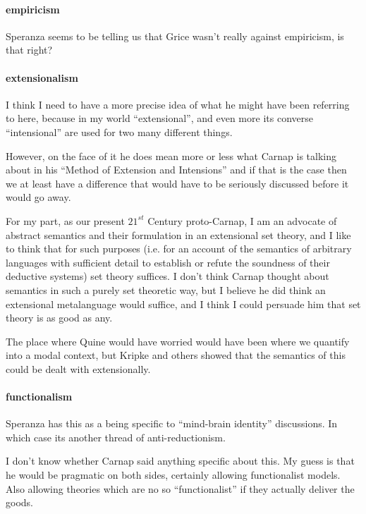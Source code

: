 \documentclass[10pt,titlepage]{book}
\begin{document}
\paragraph{empiricism}

Speranza seems to be telling us that Grice wasn't really against empiricism, is that right?
 
\paragraph{extensionalism}

I think I need to have a more precise idea of what he might have been referring to here, because in my world ``extensional'', and even more its converse ``intensional'' are used for two many different things.

However, on the face of it he does mean more or less what Carnap is talking about in his ``Method of Extension and Intensions'' and if that is the case then we at least have a difference that would have to be seriously discussed before it would go away.

For my part, as our present $21^{st}$ Century proto-Carnap, I am an advocate of abstract semantics and their formulation in an extensional set theory, and I like to think that for such purposes (i.e. for an account of the semantics of arbitrary languages with sufficient detail to establish or refute the soundness of their deductive systems) set theory suffices.
I don't think Carnap thought about semantics in such a purely set theoretic way, but I believe he did think an extensional metalanguage would suffice, and I think I could persuade him that set theory is as good as any.

The place where Quine would have worried would have been where we quantify into a modal context, but Kripke and others showed that the semantics of this could be dealt with extensionally.

\paragraph{functionalism}

Speranza has this as a being specific to ``mind-brain identity'' discussions.
In which case its another thread of anti-reductionism.

I don't know whether Carnap said anything specific about this.
My guess is that he would be pragmatic on both sides, certainly allowing functionalist models.
Also allowing theories which are no so ``functionalist'' if they actually deliver the goods.
\end{document}
